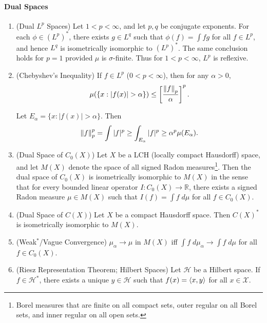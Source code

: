 \documentclass{article}
\begin{document}
\paragraph{Dual Spaces}
\begin{enumerate}[resume = real_analysis]
	\item (Dual $L^{p}$ Spaces) Let $1 < p < \infty$, and let $p, q$ be conjugate exponents. For each $\phi \in (L^{p})^{\ast}$, there exists $g \in L^{q}$ such that $\phi(f) = \int fg$ for all $f \in L^{p}$, and hence $L^q$ is isometrically isomorphic to $(L^{p})^{\ast}$. The same conclusion holds for $p = 1$ provided $\mu$ is $\sigma$-finite. Thus for $1 < p < \infty$, $L^{p}$ is reflexive. 
	\item (Chebyshev's Inequality) If $f \in L^{p}$ ($0 < p < \infty$), then for any $\alpha > 0$, 
	\begin{equation*}
		\mu(\{x: |f(x)| > \alpha\}) \leq \left[\frac{\left\Vert f \right\Vert_{p}}{\alpha}\right]^{p}. 
	\end{equation*}
	\begin{solutions}
		Let $E_{\alpha} = \{x: |f(x)| > \alpha\}$. Then 
		\begin{equation*}
			\left\Vert f \right\Vert_{p}^{p} = \int |f|^{p} \geq \int_{E_{\alpha}}|f|^{p} \geq \alpha^{p}\mu(E_{\alpha}). 
		\end{equation*}
	\end{solutions}
	\item (Dual Space of $C_{0}(X)$) Let $X$ be a LCH (locally compact Hausdorff) space, and let $M(X)$ denote the space of all signed Radon measures\footnote{Borel measures that are finite on all compact sets, outer regular on all Borel sets, and inner regular on all open sets.}. Then the dual space of $C_{0}(X)$ is isometrically isomorphic to $M(X)$ in the sense that for every bounded linear operator $I: C_{0}(X) \to \mathbb{R}$, there exists a signed Radon measure $\mu \in M(X)$ such that $I(f) = \int f\;d\mu$ for all $f \in C_{0}(X)$. 
	\item (Dual Space of $C(X)$) Let $X$ be a compact Hausdorff space. Then $C(X)^{\ast}$ is isometrically isomorphic to $M(X)$. 
	\item (Weak$^{\ast}$/Vague Convergence) $\mu_{\alpha}\to \mu$ in $M(X)$ iff $\int f\;d\mu_{\alpha} \to \int f\;d\mu$ for all $f \in C_{0}(X)$. 
	\item (Riesz Representation Theorem; Hilbert Spaces) Let $\mathscr{H}$ be a Hilbert space. If $f \in \mathscr{H}^{\ast}$, there exists a unique $y \in \mathscr{H}$ such that $f(x) = \braket{x,y}$ for all $x \in \mathscr{X}$. 
\end{enumerate}
	
\end{document}
